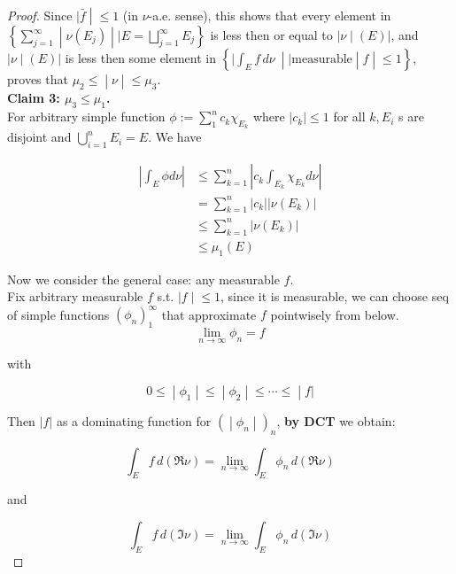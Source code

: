 \documentclass{qlnotes-export}
\begin{document}
\begin{proof}
Since \(\left. |\bar{f} \middle| \leq 1 \right.\) (in \(\nu\)-a.e. sense), this shows that every element in \(\left\{ \sum_{j = 1}^{\infty} \middle| \nu(E_{j}) \middle| \mid E = \bigsqcup_{j = 1}^{\infty}E_{j} \right\}\) is less then or equal to \(\left. |\nu \middle| (E)| \right.\), and \(\left. |\nu \middle| (E)| \right.\) is less then some element in \(\left\{ |\int_{E}f\, d\nu\  \middle| \mid \text{measurable} \middle| f \middle| \leq 1 \right\}\), proves that \(\left. \mu_{2} \leq \middle| \nu \middle| \leq \mu_{3} \right.\).\\
\textbf{Claim 3: \(\mu_{3} \leq \mu_{1}\).}\\
For arbitrary simple function \(\phi := \sum_{1}^{n}c_{k}\chi_{E_{k}}\) where \(\left| c_{k} \right| \leq 1\) for all \(k,E_{i}\) s are disjoint and \(\bigcup_{i = 1}^{n}E_{i} = E\). We have

\[\begin{matrix}
\left| {\int_{E}\phi d\nu} \right| & {\leq \sum\limits_{k = 1}^{n}\left| {c_{k}\int_{E_{k}}\chi_{E_{k}}d\nu} \right|} \\
 & {= \sum\limits_{k = 1}^{n}\left| c_{k} \right|\left| {\nu\left( E_{k} \right)} \right|} \\
 & {\leq \sum\limits_{k = 1}^{n}\left| {\nu\left( E_{k} \right)} \right|} \\
 & {\leq \mu_{1}(E)}
\end{matrix}\]

Now we consider the general case: any measurable \(f\).\\
Fix arbitrary measurable \(f\) s.t. \(\left. |f \middle| \leq 1 \right.\), since it is measurable, we can choose seq of simple functions \((\phi_{n})_{1}^{\infty}\) that approximate \(f\) pointwisely from below.\\

\[\lim\limits_{n\rightarrow\infty}\phi_{n} = f\]

with

\[\left. 0 \leq \middle| \phi_{1} \middle| \leq \middle| \phi_{2} \middle| \leq \cdots \leq \middle| f| \right.\]

Then \(|f|\) as a dominating function for \(\left. ( \middle| \phi_{n} \middle| )_{n} \right.\), \textbf{by DCT} we obtain:

\[\int_{E}f\, d(\Re\nu) = \lim\limits_{n\rightarrow\infty}\int_{E}\phi_{n}\, d(\Re\nu)\]

and

\[\int_{E}f\, d(\Im\nu) = \lim\limits_{n\rightarrow\infty}\int_{E}\phi_{n}\, d(\Im\nu)\]


\end{proof}
\end{document}

